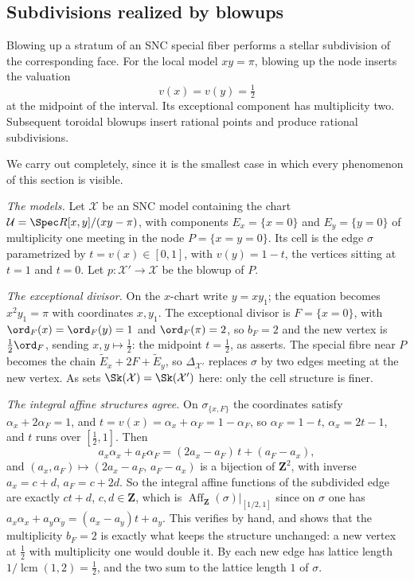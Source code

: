 \subsection{Subdivisions realized by blowups}

\begin{example}
\label{ex:blowup-stratum}
Blowing up a stratum of an SNC special fiber performs a stellar subdivision
of the corresponding face. For the local model $xy=\pi$, blowing up the
node inserts the valuation
\[
                         v(x)=v(y)=\tfrac12
\]
at the midpoint of the interval. Its exceptional component has multiplicity
two. Subsequent toroidal blowups insert rational points and produce rational
subdivisions.
\end{example}

\begin{example}
\label{ex:refinement-segment}
We carry out  completely, since it is the smallest
case in which every phenomenon of this section is visible.

\emph{The models.} Let $\mathcal X$ be an SNC model containing the chart
$\mathcal U=\Spec R[x,y]/(xy-\pi)$, with components $E_x=\{x=0\}$ and
$E_y=\{y=0\}$ of multiplicity one meeting in the node
$P=\{x=y=0\}$. Its cell is the edge $\sigma$ parametrized by
$t=v(x)\in[0,1]$, with $v(y)=1-t$, the vertices sitting at $t=1$ and
$t=0$. Let $p:\mathcal X'\to\mathcal X$ be the blowup of $P$.

\emph{The exceptional divisor.} On the $x$-chart write $y=xy_1$; the
equation becomes $x^2y_1=\pi$ with coordinates $x,y_1$. The exceptional
divisor is $F=\{x=0\}$, with $\ord_F(x)=\ord_F(y)=1$ and
$\ord_F(\pi)=2$, so $b_F=2$ and the new vertex is $\tfrac12\ord_F$,
sending $x,y\mapsto\tfrac12$: the midpoint $t=\tfrac12$, as
 asserts. The special fibre near $P$ becomes the
chain $\widetilde E_x+2F+\widetilde E_y$, so $\Delta_{\mathcal X'}$
replaces $\sigma$ by two edges meeting at the new vertex. As sets
$\Sk(\mathcal X)=\Sk(\mathcal X')$ here: only the cell structure is finer.

\emph{The integral affine structures agree.} On $\sigma_{\{x,F\}}$ the
coordinates satisfy $\alpha_x+2\alpha_F=1$, and
$t=v(x)=\alpha_x+\alpha_F=1-\alpha_F$, so $\alpha_F=1-t$,
$\alpha_x=2t-1$, and $t$ runs over $[\tfrac12,1]$. Then
\[
 a_x\alpha_x+a_F\alpha_F=(2a_x-a_F)\,t+(a_F-a_x),
\]
and $(a_x,a_F)\mapsto(2a_x-a_F,\,a_F-a_x)$ is a bijection of
$\mathbf Z^2$, with inverse $a_x=c+d$, $a_F=c+2d$. So the integral
affine functions of the subdivided edge are exactly $ct+d$,
$c,d\in\mathbf Z$, which is
$\operatorname{Aff}_{\mathbf Z}(\sigma)|_{[1/2,1]}$ since on $\sigma$
one has $a_x\alpha_x+a_y\alpha_y=(a_x-a_y)t+a_y$. This verifies
 by hand, and shows that the
multiplicity $b_F=2$ is exactly what keeps the structure unchanged: a new
vertex at $\tfrac12$ with multiplicity one would double it. By
 each new edge has lattice length
$1/\operatorname{lcm}(1,2)=\tfrac12$, and the two sum to the lattice
length $1$ of $\sigma$.


\end{example}
